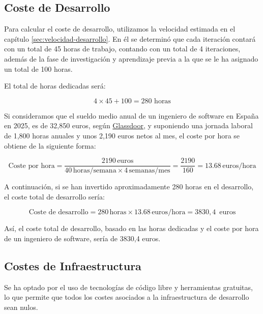 \subsection{Coste de Desarrollo}
Para calcular el coste de desarrollo, utilizamos la velocidad estimada en el capítulo \ref{sec:velocidad-desarrollo}. En él se determinó que cada iteración contará con un total de 45 horas de trabajo, contando con un total de 4 iteraciones, además de la fase de investigación y aprendizaje previa a la que se le ha asignado un total de 100 horas.  

El total de horas dedicadas será:

\begin{equation*}
    4 \times 45 + 100 = 280 \text{ horas}
\end{equation*}

Si consideramos que el sueldo medio anual de un ingeniero de software en España en 2025, es de 32,850 euros, según \href{https://www.glassdoor.es/Sueldos/ingeniero-de-software-sueldo-SRCH_KO0,21.htm}{Glassdoor}, y suponiendo una jornada laboral de 1,800 horas anuales y unos 2,190 euros netos al mes, el coste por hora se obtiene de la siguiente forma:

\begin{equation*}
    \text{Coste por hora} = \frac{2190 \, \text{euros}}{40 \, \text{horas/semana} \times 4 \, \text{semanas/mes}} = \frac{2190}{160} = 13.68 \, \text{euros/hora}
\end{equation*}

A continuación, si se han invertido aproximadamente 280 horas en el desarrollo, el coste total de desarrollo sería:

\begin{equation*}
    \text{Coste de desarrollo} = 280 \, \text{horas} \times 13.68 \, \text{euros/hora} = 3830,4 \, \text{ euros}
\end{equation*}

Así, el coste total de desarrollo, basado en las horas dedicadas y el coste por hora de un ingeniero de software, sería de 3830,4 euros.



\subsection{Costes de Infraestructura}
Se ha optado por el uso de tecnologías de código libre y herramientas gratuitas, lo que permite que todos los costes asociados a la infraestructura de desarrollo sean nulos.

